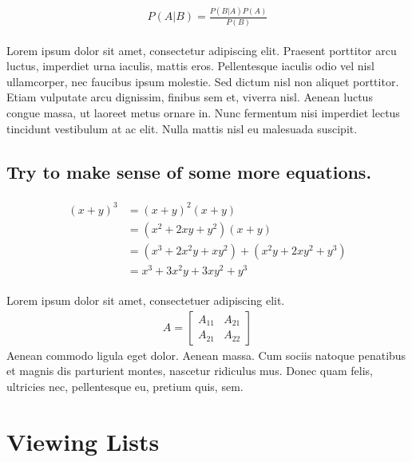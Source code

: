 \documentclass[11pt]{scrartcl} %
\begin{document}
\begin{align} 
	\label{eq:bayes}
	\begin{split}
		P(A|B) = \frac{P(B|A)P(A)}{P(B)}
	\end{split}					
\end{align}

Lorem ipsum dolor sit amet, consectetur adipiscing elit. Praesent porttitor arcu luctus, imperdiet urna iaculis, mattis eros. Pellentesque iaculis odio vel nisl ullamcorper, nec faucibus ipsum molestie. Sed dictum nisl non aliquet porttitor. Etiam vulputate arcu dignissim, finibus sem et, viverra nisl. Aenean luctus congue massa, ut laoreet metus ornare in. Nunc fermentum nisi imperdiet lectus tincidunt vestibulum at ac elit. Nulla mattis nisl eu malesuada suscipit.


\subsection{Try to make sense of some more equations.}

\begin{align} 
	\begin{split}
		(x+y)^3 &= (x+y)^2(x+y)\\
		&=(x^2+2xy+y^2)(x+y)\\
		&=(x^3+2x^2y+xy^2) + (x^2y+2xy^2+y^3)\\
		&=x^3+3x^2y+3xy^2+y^3
	\end{split}					
\end{align}

Lorem ipsum dolor sit amet, consectetuer adipiscing elit. 
\begin{align}
	A = 
	\begin{bmatrix}
		A_{11} & A_{21} \\
		A_{21} & A_{22}
	\end{bmatrix}
\end{align}
Aenean commodo ligula eget dolor. Aenean massa. Cum sociis natoque penatibus et magnis dis parturient montes, nascetur ridiculus mus. Donec quam felis, ultricies nec, pellentesque eu, pretium quis, sem.


\section{Viewing Lists}
\end{document}
